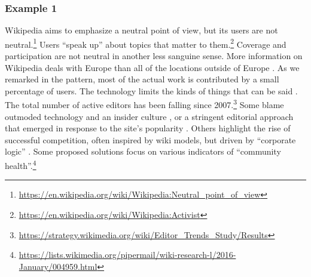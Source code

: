 

\subsubsection*{Example 1}
Wikipedia aims to emphasize a neutral point of view, but its users are
not neutral.\footnote{\url{https://en.wikipedia.org/wiki/Wikipedia:Neutral_point_of_view}}
Users ``speak up'' about topics that matter to them.\footnote{\url{https://en.wikipedia.org/wiki/Wikipedia:Activist}}
Coverage and participation are not neutral in another less sanguine sense.
More information on Wikipedia deals with Europe than
all of the locations outside of Europe \citep{graham2014uneven}.
As we remarked in the  pattern, most of the
actual work is contributed by a small percentage of users.
%
The technology limits the kinds of things that can be said \cite{graham2014uneven}. 
%
The total number of active editors has been falling since
2007.\footnote{\url{https://strategy.wikimedia.org/wiki/Editor_Trends_Study/Results}}
Some blame outmoded technology and an insider culture
\cite{simonite2013decline}, or a stringent editorial
approach that emerged in response to the site's popularity
\cite{halfaker13rise}.  Others highlight the rise of successful competition, often inspired by wiki models, but driven by ``corporate logic'' \cite{kreiss2011limits,morellintroductory}.  Some proposed solutions focus on various indicators of 
``community health''.\footnote{\url{https://lists.wikimedia.org/pipermail/wiki-research-l/2016-January/004959.html}}

\begingroup
\setlength{\columnsep}{5pt}%

